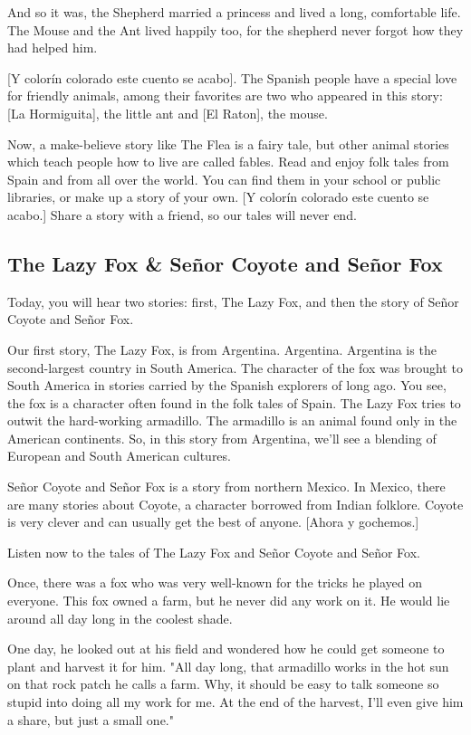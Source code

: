 And so it was, the Shepherd married a princess and lived a long, comfortable life. The Mouse and the Ant lived happily too, for the shepherd never forgot how they had helped him.

    [Y colorín colorado este cuento se acabo]. The Spanish people have a special love for friendly animals, among their favorites are two who appeared in this story: [La Hormiguita], the little ant and [El Raton], the mouse.

Now, a make-believe story like The Flea is a fairy tale, but other animal stories which teach people how to live are called fables. Read and enjoy folk tales from Spain and from all over the world. You can find them in your school or public libraries, or make up a story of your own. [Y colorín colorado este cuento se acabo.] Share a story with a friend, so our tales will never end.

\subsection{The Lazy Fox \& Señor Coyote and Señor Fox}

Today, you will hear two stories: first, The Lazy Fox, and then the story of Señor Coyote and Señor Fox.

Our first story, The Lazy Fox, is from Argentina. Argentina. Argentina is the second-largest country in South America. The character of the fox was brought to South America in stories carried by the Spanish explorers of long ago. You see, the fox is a character often found in the folk tales of Spain. The Lazy Fox tries to outwit the hard-working armadillo. The armadillo is an animal found only in the American continents. So, in this story from Argentina, we'll see a blending of European and South American cultures.

Señor Coyote and Señor Fox is a story from northern Mexico. In Mexico, there are many stories about Coyote, a character borrowed from Indian folklore. Coyote is very clever and can usually get the best of anyone. [Ahora y gochemos.]

Listen now to the tales of The Lazy Fox and Señor Coyote and Señor Fox.

Once, there was a fox who was very well-known for the tricks he played on everyone. This fox owned a farm, but he never did any work on it. He would lie around all day long in the coolest shade.

One day, he looked out at his field and wondered how he could get someone to plant and harvest it for him. "All day long, that armadillo works in the hot sun on that rock patch he calls a farm. Why, it should be easy to talk someone so stupid into doing all my work for me. At the end of the harvest, I'll even give him a share, but just a small one."

